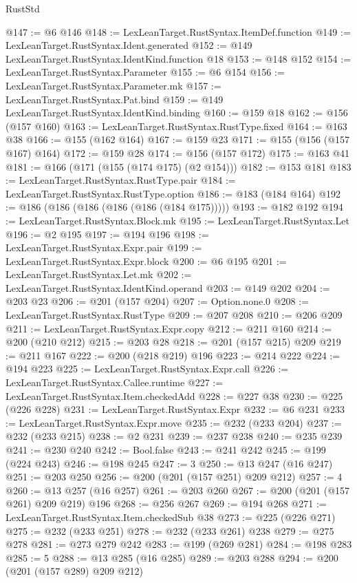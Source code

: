 \begin{lexlean}{RustStd}
\begin{coremodule}
@147 := @6 @146
@148 := LexLeanTarget.RustSyntax.ItemDef.function
@149 := LexLeanTarget.RustSyntax.Ident.generated
@152 := @149 LexLeanTarget.RustSyntax.IdentKind.function @18
@153 := @148 @152
@154 := LexLeanTarget.RustSyntax.Parameter
@155 := @6 @154
@156 := LexLeanTarget.RustSyntax.Parameter.mk
@157 := LexLeanTarget.RustSyntax.Pat.bind
@159 := @149 LexLeanTarget.RustSyntax.IdentKind.binding
@160 := @159 @18
@162 := @156 (@157 @160)
@163 := LexLeanTarget.RustSyntax.RustType.fixed
@164 := @163 @38
@166 := @155 (@162 @164)
@167 := @159 @23
@171 := @155 (@156 (@157 @167) @164)
@172 := @159 @28
@174 := @156 (@157 @172)
@175 := @163 @41
@181 := @166 (@171 (@155 (@174 @175) (@2 @154)))
@182 := @153 @181
@183 := LexLeanTarget.RustSyntax.RustType.pair
@184 := LexLeanTarget.RustSyntax.RustType.option
@186 := @183 (@184 @164)
@192 := @186 (@186 (@186 (@186 (@186 (@184 @175)))))
@193 := @182 @192
@194 := LexLeanTarget.RustSyntax.Block.mk
@195 := LexLeanTarget.RustSyntax.Let
@196 := @2 @195
@197 := @194 @196
@198 := LexLeanTarget.RustSyntax.Expr.pair
@199 := LexLeanTarget.RustSyntax.Expr.block
@200 := @6 @195
@201 := LexLeanTarget.RustSyntax.Let.mk
@202 := LexLeanTarget.RustSyntax.IdentKind.operand
@203 := @149 @202
@204 := @203 @23
@206 := @201 (@157 @204)
@207 := Option.none.{0}
@208 := LexLeanTarget.RustSyntax.RustType
@209 := @207 @208
@210 := @206 @209
@211 := LexLeanTarget.RustSyntax.Expr.copy
@212 := @211 @160
@214 := @200 (@210 @212)
@215 := @203 @28
@218 := @201 (@157 @215) @209
@219 := @211 @167
@222 := @200 (@218 @219) @196
@223 := @214 @222
@224 := @194 @223
@225 := LexLeanTarget.RustSyntax.Expr.call
@226 := LexLeanTarget.RustSyntax.Callee.runtime
@227 := LexLeanTarget.RustSyntax.Item.checkedAdd
@228 := @227 @38
@230 := @225 (@226 @228)
@231 := LexLeanTarget.RustSyntax.Expr
@232 := @6 @231
@233 := LexLeanTarget.RustSyntax.Expr.move
@235 := @232 (@233 @204)
@237 := @232 (@233 @215)
@238 := @2 @231
@239 := @237 @238
@240 := @235 @239
@241 := @230 @240
@242 := Bool.false
@243 := @241 @242
@245 := @199 (@224 @243)
@246 := @198 @245
@247 := 3
@250 := @13 @247 (@16 @247)
@251 := @203 @250
@256 := @200 (@201 (@157 @251) @209 @212)
@257 := 4
@260 := @13 @257 (@16 @257)
@261 := @203 @260
@267 := @200 (@201 (@157 @261) @209 @219) @196
@268 := @256 @267
@269 := @194 @268
@271 := LexLeanTarget.RustSyntax.Item.checkedSub @38
@273 := @225 (@226 @271)
@275 := @232 (@233 @251)
@278 := @232 (@233 @261) @238
@279 := @275 @278
@281 := @273 @279 @242
@283 := @199 (@269 @281)
@284 := @198 @283
@285 := 5
@288 := @13 @285 (@16 @285)
@289 := @203 @288
@294 := @200 (@201 (@157 @289) @209 @212)

\end{coremodule}
\end{lexlean}
